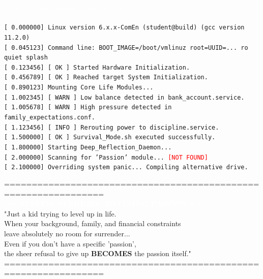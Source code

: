 \documentclass{article}
\begin{document}
\noindent
\textcolor{white}{[root@ComEn\_Student]\# dmesg | tail -n 15} \\
\\
\texttt{[    0.000000] Linux version 6.x.x-ComEn (student@build) (gcc version 11.2.0)} \\
\texttt{[    0.045123] Command line: BOOT\_IMAGE=/boot/vmlinuz root=UUID=... ro quiet splash} \\
\texttt{[    0.123456] \textcolor{CommentGreen}{[  OK  ]} Started Hardware Initialization.} \\
\texttt{[    0.456789] \textcolor{CommentGreen}{[  OK  ]} Reached target System Initialization.} \\
\texttt{[    0.890123] Mounting Core Life Modules...} \\
\texttt{[    1.002345] \textcolor{StringOrange}{[ WARN ]} Low balance detected in bank\_account.service.} \\
\texttt{[    1.005678] \textcolor{StringOrange}{[ WARN ]} High pressure detected in family\_expectations.conf.} \\
\texttt{[    1.123456] \textcolor{KeywordBlue}{[ INFO ]} Rerouting power to discipline.service.} \\
\texttt{[    1.500000] \textcolor{CommentGreen}{[  OK  ]} Survival\_Mode.sh executed successfully.} \\
\texttt{[    1.800000] Starting Deep\_Reflection\_Daemon...} \\
\texttt{[    2.000000] Scanning for 'Passion' module... \textcolor{red}{[NOT FOUND]}} \\
\texttt{[    2.100000] Overriding system panic... Compiling alternative drive.} \\

\vspace{0.6in}

\begin{center}
    \textcolor{KeywordBlue}{================================================================} \\
    \vspace{0.15in}
    \Large \textbf{\textcolor{white}{>> SYSTEM OVERRIDE: DEFINING PASSION <<}} \\
    \vspace{0.2in}
    \normalsize
    \textcolor{StringOrange}{
    "Just a kid trying to level up in life. \\
    When your background, family, and financial constraints \\
    leave absolutely no room for surrender... \\
    Even if you don't have a specific 'passion', \\
    the sheer refusal to give up \textbf{BECOMES} the passion itself."
    } \\
    \vspace{0.2in}
    \textcolor{KeywordBlue}{================================================================}
\end{center}
\end{document}
